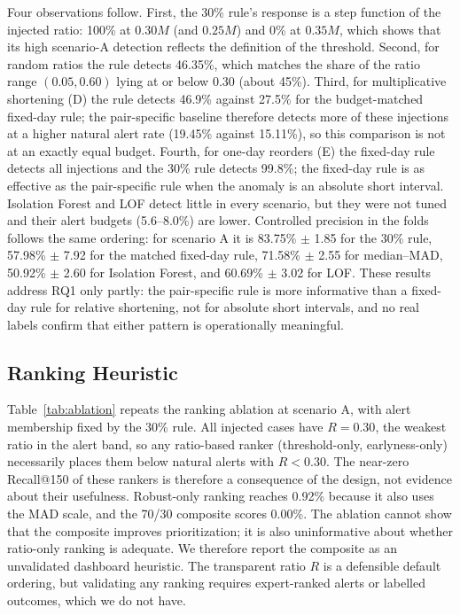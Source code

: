 \documentclass[conference]{IEEEtran}
\begin{document}
Four observations follow. First, the 30\% rule's response is a step function of the injected ratio: 100\% at $0.30M$ (and $0.25M$) and 0\% at $0.35M$, which shows that its high scenario-A detection reflects the definition of the threshold. Second, for random ratios the rule detects 46.35\%, which matches the share of the ratio range $(0.05,0.60)$ lying at or below 0.30 (about 45\%). Third, for multiplicative shortening (D) the rule detects 46.9\% against 27.5\% for the budget-matched fixed-day rule; the pair-specific baseline therefore detects more of these injections at a higher natural alert rate (19.45\% against 15.11\%), so this comparison is not at an exactly equal budget. Fourth, for one-day reorders (E) the fixed-day rule detects all injections and the 30\% rule detects 99.8\%; the fixed-day rule is as effective as the pair-specific rule when the anomaly is an absolute short interval. Isolation Forest and LOF detect little in every scenario, but they were not tuned and their alert budgets (5.6--8.0\%) are lower. Controlled precision in the folds follows the same ordering: for scenario A it is 83.75\% $\pm$ 1.85 for the 30\% rule, 57.98\% $\pm$ 7.92 for the matched fixed-day rule, 71.58\% $\pm$ 2.55 for median--MAD, 50.92\% $\pm$ 2.60 for Isolation Forest, and 60.69\% $\pm$ 3.02 for LOF. These results address RQ1 only partly: the pair-specific rule is more informative than a fixed-day rule for relative shortening, not for absolute short intervals, and no real labels confirm that either pattern is operationally meaningful.

\subsection{Ranking Heuristic}\label{sec:ranking}
Table~\ref{tab:ablation} repeats the ranking ablation at scenario A, with alert membership fixed by the 30\% rule. All injected cases have $R=0.30$, the weakest ratio in the alert band, so any ratio-based ranker (threshold-only, earlyness-only) necessarily places them below natural alerts with $R<0.30$. The near-zero Recall@150 of these rankers is therefore a consequence of the design, not evidence about their usefulness. Robust-only ranking reaches 0.92\% because it also uses the MAD scale, and the 70/30 composite scores 0.00\%. The ablation cannot show that the composite improves prioritization; it is also uninformative about whether ratio-only ranking is adequate. We therefore report the composite as an unvalidated dashboard heuristic. The transparent ratio $R$ is a defensible default ordering, but validating any ranking requires expert-ranked alerts or labelled outcomes, which we do not have.
\end{document}
